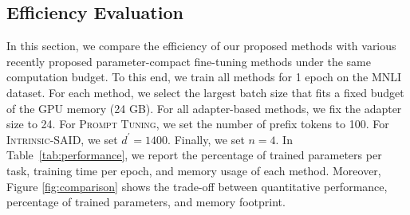 \documentclass{article}
\newcommand{\intrinsic}{\textsc{Intrinsic-SAID}\xspace}
\newcommand{\prompttuning}{\textsc{Prompt Tuning}\xspace}
\begin{document}
\subsection{Efficiency Evaluation} \label{sec:performance}
In this section, we compare the efficiency of our proposed methods with various recently proposed parameter-compact fine-tuning methods under the same computation budget. To this end,  we train all methods for 1 epoch on the MNLI dataset. For each method,  we select the largest batch size that fits a fixed budget of the GPU memory (24 GB). For all adapter-based methods, we fix the adapter size to 24. For \prompttuning, we set the number of prefix tokens to 100. For \intrinsic, we set $d^{\prime}=1400$. Finally, we set $n=4$. In Table~\ref{tab:performance}, we report the percentage of trained parameters per task, training time per epoch, and memory usage of each method. %
Moreover, Figure \ref{fig:comparison} shows the trade-off between quantitative performance, percentage of trained parameters, and memory footprint. 
\end{document}
